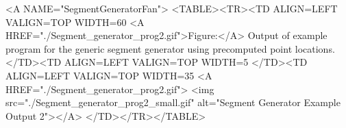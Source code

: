 
\begin{ccHtmlOnly}
  <A NAME="SegmentGeneratorFan">
  <TABLE><TR><TD ALIGN=LEFT VALIGN=TOP WIDTH=60%
    <A HREF="./Segment_generator_prog2.gif">Figure:</A>
    Output of example program for the generic segment generator using
    precomputed point locations.
  </TD><TD ALIGN=LEFT VALIGN=TOP WIDTH=5%
  </TD><TD ALIGN=LEFT VALIGN=TOP WIDTH=35%
    <A HREF="./Segment_generator_prog2.gif">
        <img src="./Segment_generator_prog2_small.gif" 
             alt="Segment Generator Example Output 2"></A>
  </TD></TR></TABLE>
\end{ccHtmlOnly}

\beforecprogskip\parskip
{}


